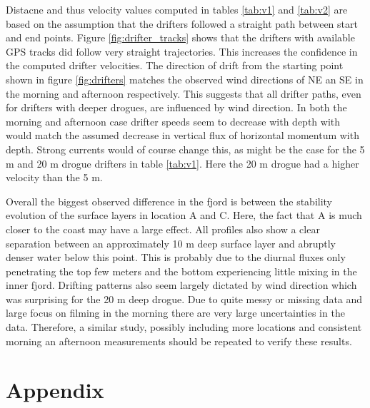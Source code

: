 \documentclass[a4paper,10pt,english]{article}
\begin{document}
Distacne and thus velocity values computed in tables \ref*{tab:v1} and \ref*{tab:v2} are based on the assumption that the drifters followed a straight path between start and end points. Figure \ref*{fig:drifter_tracks} shows that the drifters with available GPS tracks did follow very straight trajectories. This increases the confidence in the computed drifter velocities. The direction of drift from the starting point shown in figure \ref*{fig:drifters} matches the observed wind directions of NE an SE in the morning and afternoon respectively. This suggests that all drifter paths, even for drifters with deeper drogues, are influenced by wind direction. In both the morning and afternoon case drifter speeds seem to decrease with depth with would match the assumed decrease in vertical flux of horizontal momentum with depth. Strong currents would of course change this, as might be the case for the 5 m and 20 m drogue drifters in table \ref*{tab:v1}. Here the 20 m drogue had a higher velocity than the 5 m.

Overall the biggest observed difference in the fjord is between the stability evolution of the surface layers in location A and C. Here, the fact that A is much closer to the coast may have a large effect. All profiles also show a clear separation between an approximately 10 m deep surface layer and abruptly denser water below this point. This is probably due to the diurnal fluxes only penetrating the top few meters and the bottom experiencing little mixing in the inner fjord. Drifting patterns also seem largely dictated by wind direction which was surprising for the 20 m deep drogue. Due to quite messy or missing data and large focus on filming in the morning there are very large uncertainties in the data. Therefore, a similar study, possibly including more locations and consistent morning an afternoon measurements should be repeated to verify these results.

\newpage
\appendix
\section{Appendix}
\end{document}
